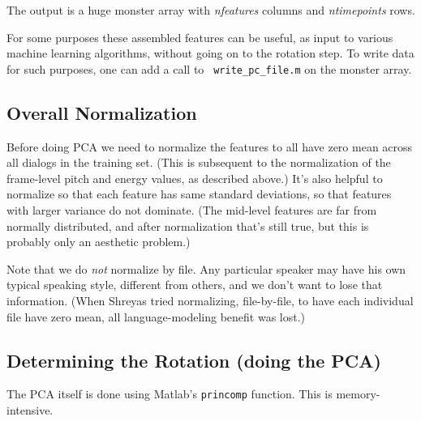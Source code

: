 \documentclass[11pt]{article}
\begin{document}
The output is a huge monster array with {\it nfeatures} columns and
{\it ntimepoints} rows.

For some purposes these assembled features can be useful, as input to
various machine learning algorithms, without going on to the rotation
step.  To write data for such purposes, one can add a call to {\tt
  write\_pc\_file.m} on the monster array.


\subsection{Overall Normalization}

Before doing PCA we need to normalize the features to all have zero
mean across all dialogs in the training set.  (This is subsequent to
the normalization of the frame-level pitch and energy values, as
described above.)  It's also helpful to normalize so that each feature
has same standard deviations, so that features with larger variance do
not dominate.  (The mid-level features are far from normally
distributed, and after normalization that's still true, but this is
probably only an aesthetic problem.)


Note that we do {\em not} normalize by file.  Any particular speaker
may have his own typical speaking style, different from others, and we
don't want to lose that information.  (When Shreyas tried normalizing,
file-by-file, to have each individual file have zero mean, all
language-modeling benefit was lost.)

\subsection{Determining the Rotation (doing the PCA)}   \label{rotating}

The PCA itself is done using Matlab's {\tt princomp} function.  This
is memory-intensive.

\end{document}
